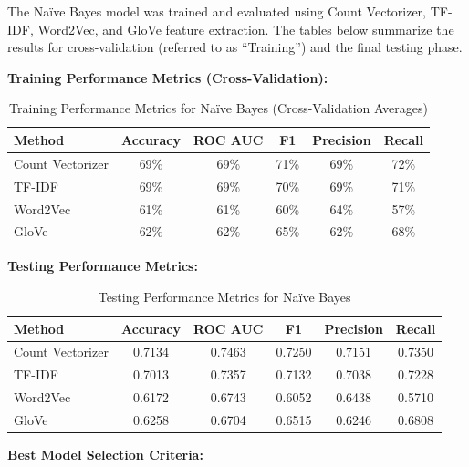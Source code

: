 The Naïve Bayes model was trained and evaluated using Count Vectorizer, TF-IDF, Word2Vec, and GloVe feature extraction. The tables below summarize the results for cross-validation (referred to as “Training”) and the final testing phase.

\textbf{Training Performance Metrics (Cross-Validation):}

\begin{table}[H]
    \centering
    \caption{Training Performance Metrics for Naïve Bayes (Cross-Validation Averages)}
    \label{tab:nb-training-metrics}
    \begin{tabular}{|l|c|c|c|c|c|}
        \hline
        \textbf{Method} & \textbf{Accuracy} & \textbf{ROC AUC} & \textbf{F1} & \textbf{Precision} & \textbf{Recall} \\ 
        \hline
        Count Vectorizer & 69\% & 69\% & 71\% & 69\% & 72\% \\ 
        \hline
        TF-IDF & 69\% & 69\% & 70\% & 69\% & 71\% \\ 
        \hline
        Word2Vec & 61\% & 61\% & 60\% & 64\% & 57\% \\ 
        \hline
        GloVe & 62\% & 62\% & 65\% & 62\% & 68\% \\ 
        \hline
    \end{tabular}
\end{table}

\textbf{Testing Performance Metrics:}

\begin{table}[H]
    \centering
    \caption{Testing Performance Metrics for Naïve Bayes}
    \label{tab:nb-testing-metrics}
    \begin{tabular}{|l|c|c|c|c|c|}
        \hline
        \textbf{Method} & \textbf{Accuracy} & \textbf{ROC AUC} & \textbf{F1} & \textbf{Precision} & \textbf{Recall} \\ 
        \hline
        Count Vectorizer & 0.7134 & 0.7463 & 0.7250 & 0.7151 & 0.7350 \\ 
        \hline
        TF-IDF & 0.7013 & 0.7357 & 0.7132 & 0.7038 & 0.7228 \\ 
        \hline
        Word2Vec & 0.6172 & 0.6743 & 0.6052 & 0.6438 & 0.5710 \\ 
        \hline
        GloVe & 0.6258 & 0.6704 & 0.6515 & 0.6246 & 0.6808 \\ 
        \hline
    \end{tabular}
\end{table}

\textbf{Best Model Selection Criteria:}

